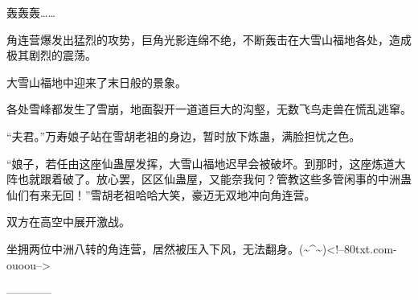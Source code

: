 \begin{this_body}
轰轰轰……

角连营爆发出猛烈的攻势，巨角光影连绵不绝，不断轰击在大雪山福地各处，造成极其剧烈的震荡。

大雪山福地中迎来了末日般的景象。

各处雪峰都发生了雪崩，地面裂开一道道巨大的沟壑，无数飞鸟走兽在慌乱逃窜。

“夫君。”万寿娘子站在雪胡老祖的身边，暂时放下炼蛊，满脸担忧之色。

“娘子，若任由这座仙蛊屋发挥，大雪山福地迟早会被破坏。到那时，这座炼道大阵也就跟着破了。放心罢，区区仙蛊屋，又能奈我何？管教这些多管闲事的中洲蛊仙们有来无回！”雪胡老祖哈哈大笑，豪迈无双地冲向角连营。

双方在高空中展开激战。

坐拥两位中洲八转的角连营，居然被压入下风，无法翻身。(\~{}\^{}\~{})<!--80txt.com-ouoou-->

------------

\end{this_body}

